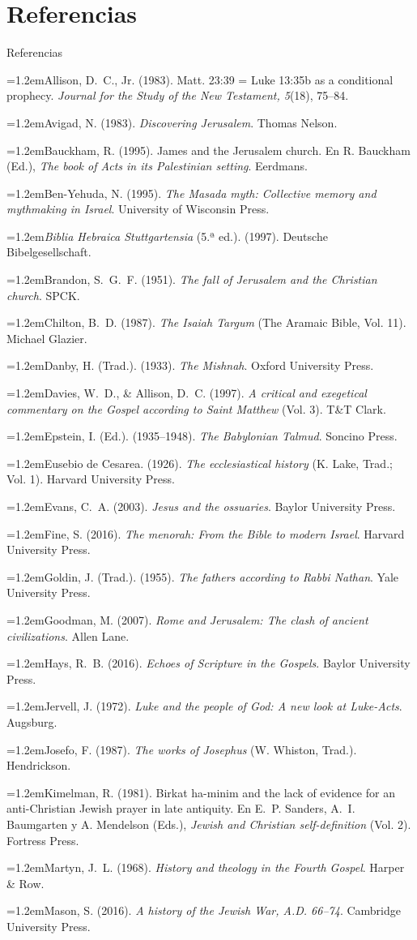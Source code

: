 \documentclass[hyperref={bookmarks=false},aspectratio=169]{beamer}
\newcommand{\refapa}[1]{\par\hangindent=1.2em\hangafter=1\noindent #1\par\vspace{3pt}}
\begin{document}
\section{Referencias}
\begin{frame}[allowframebreaks]{Referencias}
\tiny
\refapa{Allison, D.~C., Jr. (1983). Matt. 23:39 = Luke 13:35b as a conditional prophecy. \emph{Journal for the Study of the New Testament, 5}(18), 75--84.}
\refapa{Avigad, N. (1983). \emph{Discovering Jerusalem}. Thomas Nelson.}
\refapa{Bauckham, R. (1995). James and the Jerusalem church. En R. Bauckham (Ed.), \emph{The book of Acts in its Palestinian setting}. Eerdmans.}
\refapa{Ben-Yehuda, N. (1995). \emph{The Masada myth: Collective memory and mythmaking in Israel}. University of Wisconsin Press.}
\refapa{\emph{Biblia Hebraica Stuttgartensia} (5.ª ed.). (1997). Deutsche Bibelgesellschaft.}
\refapa{Brandon, S.~G.~F. (1951). \emph{The fall of Jerusalem and the Christian church}. SPCK.}
\refapa{Chilton, B.~D. (1987). \emph{The Isaiah Targum} (The Aramaic Bible, Vol. 11). Michael Glazier.}
\refapa{Danby, H. (Trad.). (1933). \emph{The Mishnah}. Oxford University Press.}
\refapa{Davies, W.~D., \& Allison, D.~C. (1997). \emph{A critical and exegetical commentary on the Gospel according to Saint Matthew} (Vol. 3). T\&T Clark.}
\refapa{Epstein, I. (Ed.). (1935--1948). \emph{The Babylonian Talmud}. Soncino Press.}
\refapa{Eusebio de Cesarea. (1926). \emph{The ecclesiastical history} (K. Lake, Trad.; Vol. 1). Harvard University Press.}
\refapa{Evans, C.~A. (2003). \emph{Jesus and the ossuaries}. Baylor University Press.}
\refapa{Fine, S. (2016). \emph{The menorah: From the Bible to modern Israel}. Harvard University Press.}
\refapa{Goldin, J. (Trad.). (1955). \emph{The fathers according to Rabbi Nathan}. Yale University Press.}
\refapa{Goodman, M. (2007). \emph{Rome and Jerusalem: The clash of ancient civilizations}. Allen Lane.}
\refapa{Hays, R.~B. (2016). \emph{Echoes of Scripture in the Gospels}. Baylor University Press.}
\refapa{Jervell, J. (1972). \emph{Luke and the people of God: A new look at Luke-Acts}. Augsburg.}
\refapa{Josefo, F. (1987). \emph{The works of Josephus} (W. Whiston, Trad.). Hendrickson.}
\refapa{Kimelman, R. (1981). Birkat ha-minim and the lack of evidence for an anti-Christian Jewish prayer in late antiquity. En E.~P. Sanders, A.~I. Baumgarten y A. Mendelson (Eds.), \emph{Jewish and Christian self-definition} (Vol. 2). Fortress Press.}
\refapa{Martyn, J.~L. (1968). \emph{History and theology in the Fourth Gospel}. Harper \& Row.}
\refapa{Mason, S. (2016). \emph{A history of the Jewish War, A.D. 66--74}. Cambridge University Press.}

\end{frame}
\end{document}
